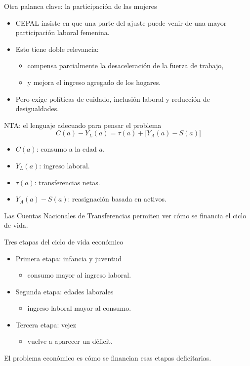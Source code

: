 \documentclass{beamer}
\begin{document}
\begin{frame}{Otra palanca clave: la participación de las mujeres}
\begin{itemize}
    \item CEPAL insiste en que una parte del ajuste puede venir de una mayor participación laboral femenina.
    \item Esto tiene doble relevancia:
    \begin{itemize}
        \item compensa parcialmente la desaceleración de la fuerza de trabajo,
        \item y mejora el ingreso agregado de los hogares.
    \end{itemize}
    \item Pero exige políticas de cuidado, inclusión laboral y reducción de desigualdades.
\end{itemize}
\end{frame}

\begin{frame}{NTA: el lenguaje adecuado para pensar el problema}
\[
C(a)-Y_L(a)=\tau(a)+\big[Y_A(a)-S(a)\big]
\]

\begin{itemize}
    \item $C(a)$: consumo a la edad $a$.
    \item $Y_L(a)$: ingreso laboral.
    \item $\tau(a)$: transferencias netas.
    \item $Y_A(a)-S(a)$: reasignación basada en activos.
\end{itemize}

\vspace{0.3cm}
Las Cuentas Nacionales de Transferencias permiten ver cómo se financia el ciclo de vida.
\end{frame}

\begin{frame}{Tres etapas del ciclo de vida económico}
\begin{itemize}
    \item Primera etapa: infancia y juventud
    \begin{itemize}
        \item consumo mayor al ingreso laboral.
    \end{itemize}
    \item Segunda etapa: edades laborales
    \begin{itemize}
        \item ingreso laboral mayor al consumo.
    \end{itemize}
    \item Tercera etapa: vejez
    \begin{itemize}
        \item vuelve a aparecer un déficit.
    \end{itemize}
\end{itemize}

\vspace{0.3cm}
El problema económico es cómo se financian esas etapas deficitarias.
\end{frame}
\end{document}
